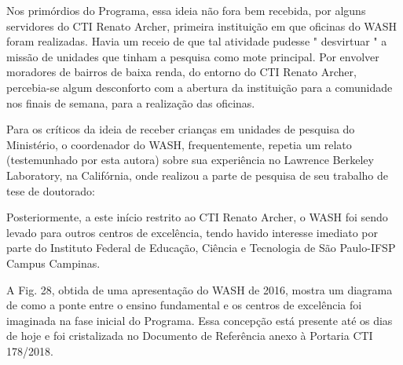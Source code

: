 Nos primórdios do Programa, essa ideia não fora bem recebida, por alguns servidores do CTI Renato Archer, primeira instituição em que oficinas do WASH foram realizadas. Havia um receio de que tal atividade pudesse " desvirtuar " a missão de unidades que tinham a pesquisa como mote principal. Por envolver moradores de bairros de baixa renda, do entorno do CTI Renato Archer, percebia-se algum desconforto com a abertura da instituição para a comunidade nos finais de semana, para a realização das oficinas.

Para os críticos da ideia de receber crianças em unidades de pesquisa do Ministério, o coordenador do WASH, frequentemente, repetia um relato (testemunhado por esta autora) sobre sua experiência no Lawrence Berkeley Laboratory, na Califórnia, onde realizou a parte de pesquisa de seu trabalho de tese de doutorado:


\noindent\begin{flushright}\mbox{\linespread{1}\selectfont\centering{}}\end{flushright}


Posteriormente, a este início restrito ao CTI Renato Archer, o WASH foi sendo levado para outros centros de excelência, tendo havido interesse imediato por parte do Instituto Federal de Educação, Ciência e Tecnologia de São Paulo-IFSP Campus Campinas.

A Fig. 28, obtida de uma apresentação do WASH de 2016, mostra um diagrama de como a ponte entre o ensino fundamental e os centros de excelência foi imaginada na fase inicial do Programa. Essa concepção está presente até os dias de hoje e foi cristalizada no Documento de Referência anexo à Portaria CTI 178/2018.



